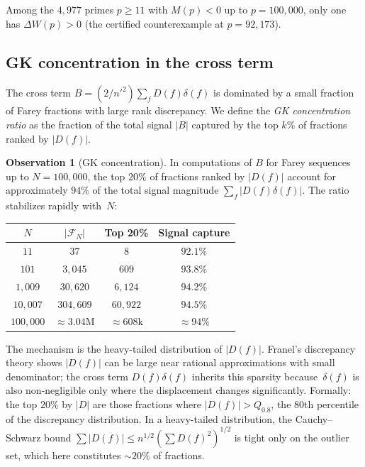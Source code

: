 \documentclass[11pt]{article}
\theoremstyle{definition}
\newtheorem{observation}[theorem]{Observation}
\begin{document}
\noindent Among the $4{,}977$ primes $p \ge 11$ with $M(p) < 0$
up to $p = 100{,}000$, only one has $\Delta W(p) > 0$ (the
certified counterexample at $p = 92{,}173$).

\subsection{GK concentration in the cross term}\label{subsec:gk-concentration}

The cross term $B = (2/{n'}^2)\sum_{f} D(f)\delta(f)$ is dominated
by a small fraction of Farey fractions with large rank discrepancy.
We define the \emph{GK concentration ratio} as the fraction of the
total signal $|B|$ captured by the top $k\%$ of fractions ranked
by $|D(f)|$.

\begin{observation}[GK concentration]
In computations of $B$ for Farey sequences up to $N = 100{,}000$,
the top $20\%$ of fractions ranked by $|D(f)|$ account for
approximately $94\%$ of the total signal magnitude $\sum_f |D(f)\delta(f)|$.
The ratio stabilizes rapidly with~$N$:
\begin{center}
\begin{tabular}{cccc}
\toprule
$N$ & $|\mathcal{F}_N|$ & Top 20\% & Signal capture \\
\midrule
$11$ & $37$ & $8$ & $92.1\%$ \\
$101$ & $3{,}045$ & $609$ & $93.8\%$ \\
$1{,}009$ & $30{,}620$ & $6{,}124$ & $94.2\%$ \\
$10{,}007$ & $304{,}609$ & $60{,}922$ & $94.5\%$ \\
$100{,}000$ & ${\approx}3.04\mathrm{M}$ & ${\approx}608\mathrm{k}$ & ${\approx}94\%$ \\
\bottomrule
\end{tabular}
\end{center}
\end{observation}

\noindent The mechanism is the heavy-tailed distribution of $|D(f)|$.
Franel's discrepancy theory shows $|D(f)|$ can be large near rational
approximations with small denominator; the cross term
$D(f)\delta(f)$ inherits this sparsity because~$\delta(f)$ is
also non-negligible only where the displacement changes significantly.
Formally: the top $20\%$ by $|D|$ are those fractions where
$|D(f)| > Q_{0.8}$, the $80$th percentile of the discrepancy
distribution.  In a heavy-tailed distribution, the Cauchy--Schwarz
bound $\sum |D(f)| \le n^{1/2}(\sum D(f)^2)^{1/2}$ is tight only
on the outlier set, which here constitutes $\sim 20\%$ of fractions.
\end{document}
